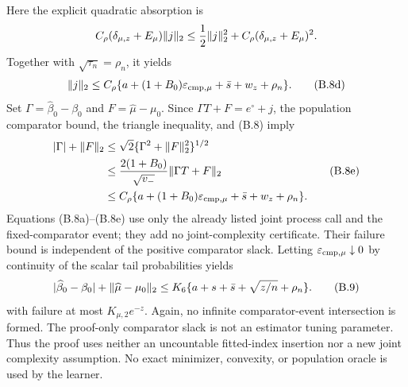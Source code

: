 Here the explicit quadratic absorption is
\[
 C_\rho(\delta_{\mu,z}+E_\mu)\lVert j\rVert_2
 \le\frac12\lVert j\rVert_2^2
     +C_\rho(\delta_{\mu,z}+E_\mu)^2.
\]
Together with \(\sqrt{\tau_n}=\rho_n\), it yields
\begin{equation}
 \lVert j\rVert_2\le C_\rho\{a+(1+B_0)\varepsilon_{\rm cmp,\mu}
                         +\bar s+w_z+\rho_n\}.
 \tag{B.8d}
\end{equation}
Set \(\Gamma=\widehat\beta_0-\beta_0\) and
\(F=\widehat\mu-\mu_0\).  Since \(\Gamma T+F=e^\circ+j\), the population
comparator bound, the triangle inequality, and (B.8) imply
\begin{equation}
 \begin{split}
 |\Gamma|+\lVert F\rVert_2
 &\le \sqrt2\{\Gamma^2+\lVert F\rVert_2^2\}^{1/2}\\
 &\le \frac{2(1+B_0)}{\sqrt{v_-}}\lVert \Gamma T+F\rVert_2\\
 &\le C_\rho\{a+(1+B_0)\varepsilon_{\rm cmp,\mu}
                +\bar s+w_z+\rho_n\}.
 \end{split}
 \tag{B.8e}
\end{equation}
Equations (B.8a)--(B.8e) use only the already listed joint process call and
the fixed-comparator event; they add no joint-complexity certificate.  Their
failure bound is independent of the positive comparator slack.  Letting
\(\varepsilon_{\rm cmp,\mu}\downarrow0\) by continuity of the scalar tail
probabilities
yields
\begin{equation}
 \lvert \widehat\beta_0-\beta_0\rvert+\lVert \widehat\mu-\mu_0\rVert_2
 \le K_6\{a+s+\bar s+\sqrt{z/n}+\rho_n\}.
 \tag{B.9}
\end{equation}
with failure at most \(K_{\mu,2}e^{-z}\).  Again, no infinite
comparator-event intersection is formed.
The proof-only comparator slack is not an estimator tuning parameter.  Thus
the proof uses neither an uncountable fitted-index insertion nor a new joint
complexity assumption.
No exact minimizer, convexity, or population oracle is used by the learner.

